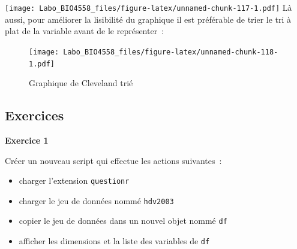 \documentclass[12pt,]{book}
\newenvironment{Shaded}{\begin{snugshade}}{\end{snugshade}}
\newcommand{\KeywordTok}[1]{\textcolor[rgb]{0.27,0.27,0.27}{\textbf{#1}}}
\newcommand{\NormalTok}[1]{#1}
\newcommand{\OperatorTok}[1]{\textcolor[rgb]{0.43,0.43,0.43}{\textbf{#1}}}
\newcommand{\StringTok}[1]{\textcolor[rgb]{0.5,0.5,0.5}{#1}}
\providecommand{\tightlist}{%
  \setlength{\itemsep}{0pt}\setlength{\parskip}{0pt}}
\begin{document}
\texttt{[image: Labo\_BIO4558\_files/figure-latex/unnamed-chunk-117-1.pdf]}
Là aussi, pour améliorer la lisibilité du graphique il est préférable de trier le tri à plat de la variable avant de le représenter~:

\begin{Shaded}
\end{Shaded}

\begin{figure}
\centering
\texttt{[image: Labo\_BIO4558\_files/figure-latex/unnamed-chunk-118-1.pdf]}
\caption{\label{fig:unnamed-chunk-118}Graphique de Cleveland trié}
\end{figure}

\hypertarget{ex-introR-univ}{%
\subsection{Exercices}\label{ex-introR-univ}}

\textbf{Exercice 1}

Créer un nouveau script qui effectue les actions suivantes~:

\begin{itemize}
\tightlist
\item
  charger l'extension \texttt{questionr}
\item
  charger le jeu de données nommé \texttt{hdv2003}
\item
  copier le jeu de données dans un nouvel objet nommé \texttt{df}
\item
  afficher les dimensions et la liste des variables de \texttt{df}
\end{itemize}

\end{document}
